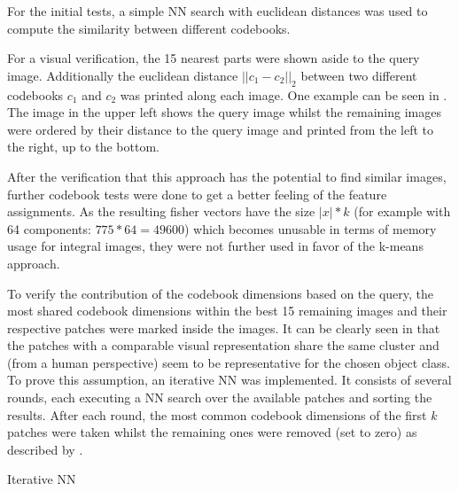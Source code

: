 For the initial tests, a simple \acf{NN} search with euclidean distances was used to compute the similarity between different codebooks.

For a visual verification, the 15 nearest parts were shown aside to the query image. Additionally the euclidean distance $||c_1-c_2||_2$ between two different codebooks $c_1$ and $c_2$ was printed along each image. One example can be seen in . The image in the upper left shows the query image whilst the remaining images were ordered by their distance to the query image and printed from the left to the right, up to the bottom.


After the verification that this approach has the potential to find similar images, further codebook tests were done to get a better feeling of the feature assignments. As the resulting fisher vectors have the size $|x| * k$ (for example with 64 components: $775 * 64 = 49600$) which becomes unusable in terms of memory usage for integral images, they were not further used in favor of the k-means approach.

To verify the contribution of the codebook dimensions based on the query, the most shared codebook dimensions within the best 15 remaining images and their respective patches were marked inside the images. It can be clearly seen in  that the patches with a comparable visual representation share the same cluster and (from a human perspective) seem to be representative for the chosen object class.
To prove this assumption, an iterative \ac{NN} was implemented. It consists of several rounds, each executing a \ac{NN} search over the available patches and sorting the results. After each round, the most common codebook dimensions of the first $k$ patches were taken whilst the remaining ones were removed (set to zero) as described by .

\begin{algorithm}
	\caption{Iterative \ac{NN}}
	\label{alg:iterative_nn}
\end{algorithm}

